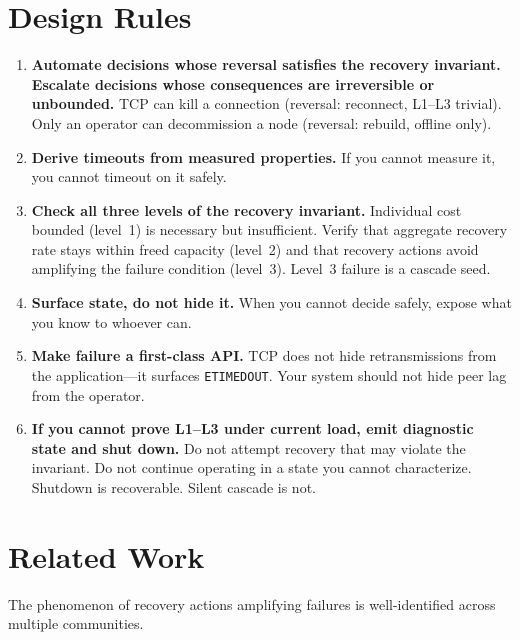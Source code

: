 \documentclass[11pt]{article}
\begin{document}
\section{Design Rules}

\begin{enumerate}
  \item \textbf{Automate decisions whose reversal satisfies the recovery
    invariant. Escalate decisions whose consequences are irreversible or
    unbounded.} TCP can kill a connection (reversal: reconnect, L1--L3 trivial).
    Only an operator can decommission a node (reversal: rebuild, offline only).

  \item \textbf{Derive timeouts from measured properties.} If you cannot measure
    it, you cannot timeout on it safely.

  \item \textbf{Check all three levels of the recovery invariant.} Individual
    cost bounded (level~1) is necessary but insufficient. Verify that aggregate
    recovery rate stays within freed capacity (level~2) and that recovery actions
    avoid amplifying the failure condition (level~3). Level~3 failure is a
    cascade seed.

  \item \textbf{Surface state, do not hide it.} When you cannot decide safely,
    expose what you know to whoever can.

  \item \textbf{Make failure a first-class API.} TCP does not hide
    retransmissions from the application---it surfaces \texttt{ETIMEDOUT}. Your
    system should not hide peer lag from the operator.

  \item \textbf{If you cannot prove L1--L3 under current load, emit diagnostic
    state and shut down.} Do not attempt recovery that may violate the invariant.
    Do not continue operating in a state you cannot characterize. Shutdown is
    recoverable. Silent cascade is not.
\end{enumerate}

\section{Related Work}
\label{sec:related-work}

The phenomenon of recovery actions amplifying failures is well-identified across
multiple communities.
\end{document}
